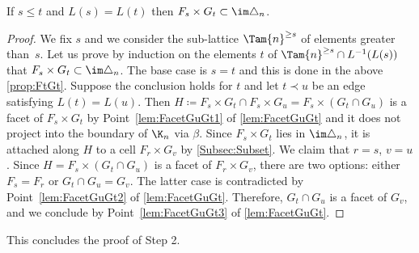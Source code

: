 \begin{proposition}
If $s\leq t$ and $L(s) = L(t)$ then $F_s\times G_t\subset \im\triangle_n$.
\end{proposition}

\begin{proof}
We fix $s$ and we consider the sub-lattice $\Tam{n}^{\geq s}$ of elements greater than~$s$.
Let us prove by induction on the elements $t$ of $\Tam{n}^{\geq s}\cap L^{-1}(L(s))$ that
$F_s\times G_t\subset \im\triangle_n$.
The base case is $s=t$ and this is done in the above \cref{prop:FtGt}.
Suppose the conclusion holds for $t$ and let $t\prec u$ be an edge satisfying $L(t)= L(u)$.
Then $H \coloneqq F_s\times G_t\cap F_s\times G_u = F_s\times (G_t\cap G_u)$ is a facet of $F_s\times G_t$
by Point~\eqref{lem:FacetGuGt1} of \cref{lem:FacetGuGt} and it does not project into the boundary of $\K_n$ via $\beta$.
Since $F_s\times G_t$ lies in $\im\triangle_n$, it is attached along $H$ to a cell
$F_r\times G_v$ by \cref{Subsec:Subset}.
We claim that $r=s$, $v=u$.
Since $H=F_s\times (G_t\cap G_u)$ is a facet of $F_r\times G_v$, there are two options: either $F_s=F_r$ or $G_t\cap G_u=G_v$. The latter case is contradicted by Point~\eqref{lem:FacetGuGt2} of \cref{lem:FacetGuGt}.
Therefore, $G_t\cap G_u$ is a facet of $G_v$, and we conclude by
Point~\eqref{lem:FacetGuGt3} of \cref{lem:FacetGuGt}.
\end{proof}

This concludes the proof of Step 2.

\Changelback
